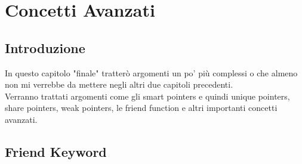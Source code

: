 
\chapter{Concetti Avanzati}











\section{Introduzione}

\textsf{\small In questo capitolo "finale" tratterò argomenti un po' più complessi o che almeno non mi verrebbe da mettere negli altri due capitoli precedenti.} \\

\textsf{\small Verranno trattati argomenti come gli smart pointers e quindi unique pointers, share pointers, weak pointers, le friend function e altri importanti concetti avanzati.} \\


\newpage

\section{Friend Keyword}

